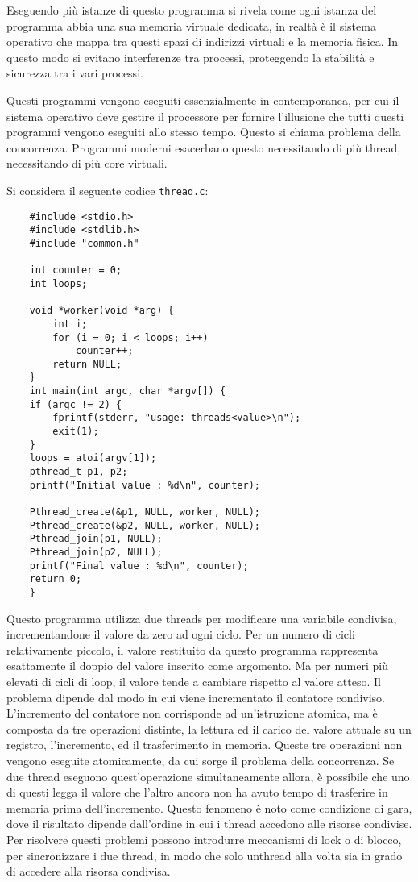 \documentclass{article}
\numberwithin{equation}{subsection}
\begin{document}
Eseguendo più istanze di questo programma si rivela come ogni istanza del programma abbia una sua memoria virtuale dedicata, in realtà è il sistema operativo che mappa 
tra questi spazi di indirizzi virtuali e la memoria fisica. In questo modo si evitano interferenze tra processi, proteggendo la stabilità e sicurezza tra i vari processi. 


Questi programmi vengono eseguiti essenzialmente in contemporanea, per cui il sistema operativo deve gestire il processore per fornire l'illusione 
che tutti questi programmi vengono eseguiti allo stesso tempo. Questo si chiama problema della concorrenza. 
Programmi moderni esacerbano questo necessitando di più thread, necessitando di più core virtuali. 

Si considera il seguente codice \verb|thread.c|:
\begin{verbatim}
	#include <stdio.h>
	#include <stdlib.h>
	#include "common.h"

	int counter = 0;
	int loops;

	void *worker(void *arg) {
		int i;
		for (i = 0; i < loops; i++) 
			counter++;
		return NULL;
	}
	int main(int argc, char *argv[]) {
	if (argc != 2) {
		fprintf(stderr, "usage: threads<value>\n");
		exit(1);
	}
	loops = atoi(argv[1]);
	pthread_t p1, p2;
	printf("Initial value : %d\n", counter);

	Pthread_create(&p1, NULL, worker, NULL);
	Pthread_create(&p2, NULL, worker, NULL);
	Pthread_join(p1, NULL);
	Pthread_join(p2, NULL);
	printf("Final value : %d\n", counter);
	return 0;
	}
\end{verbatim}

Questo programma utilizza due threads per modificare una variabile condivisa, incrementandone il valore da zero ad ogni ciclo. 
Per un numero di cicli relativamente piccolo, il valore restituito da questo programma rappresenta esattamente il doppio del valore inserito 
come argomento. Ma per numeri più elevati di cicli di loop, il valore tende a cambiare rispetto al valore atteso. 
Il problema dipende dal modo in cui viene incrementato il contatore condiviso. L'incremento del contatore non corrisponde ad un'istruzione 
atomica, ma è composta da tre operazioni distinte, la lettura ed il carico del valore attuale su un registro, l'incremento, ed il trasferimento in 
memoria. Queste tre operazioni non vengono eseguite atomicamente, da cui sorge il problema della concorrenza. Se due thread eseguono quest'operazione 
simultaneamente allora, è possibile che uno di questi legga il valore che l'altro ancora non ha avuto tempo di trasferire in memoria prima dell'incremento. 
Questo fenomeno è noto come condizione di gara, dove il risultato dipende dall'ordine in cui i thread accedono alle risorse condivise. Per risolvere questi problemi 
possono introdurre meccanismi di lock o di blocco, per sincronizzare i due thread, in modo che solo unthread alla volta sia in grado di accedere alla risorsa condivisa. 
\end{document}
